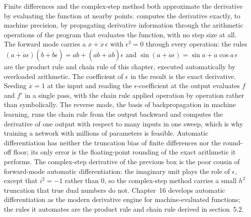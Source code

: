 \begin{mastery}
Finite differences and the complex-step method both approximate the
derivative by evaluating the function at nearby points.
 computes the derivative exactly,
to machine precision, by propagating derivative information through
the arithmetic operations of the program that evaluates the
function, with no step size at all. The forward mode carries a
 $x + \dot{x}\,\epsilon$ with $\epsilon^{2} =
0$ through every operation: the rules $\,(a + \dot{a}\epsilon)(b +
\dot{b}\epsilon) = ab + (a\dot{b} + \dot{a}b)\epsilon$ and
$\sin(a + \dot{a}\epsilon) = \sin a + \dot{a}\cos a\,\epsilon$ are
the product rule and chain rule of this chapter, executed
automatically by overloaded arithmetic. The coefficient of
$\epsilon$ in the result is the exact derivative. Seeding $\dot{x}
= 1$ at the input and reading the $\epsilon$-coefficient at the
output evaluates $f$ and $f'$ in a single pass, with the chain rule
applied operation by operation rather than symbolically. The
reverse mode, the basis of backpropagation in machine learning,
runs the chain rule from the output backward and computes the
derivative of one output with respect to many inputs in one sweep,
which is why training a network with millions of parameters is
feasible. Automatic differentiation has neither the truncation bias
of finite differences nor the round-off floor; its only error is
the floating-point rounding of the exact arithmetic it performs.
The complex-step derivative of the previous box is the poor cousin
of forward-mode automatic differentiation: the imaginary unit plays
the role of $\epsilon$, except that $i^{2} = -1$ rather than $0$, so
the complex-step method carries a small $h^{2}$ truncation that true
dual numbers do not. Chapter~16 develops automatic differentiation
as the modern derivative engine for machine-evaluated functions; the
rules it automates are the product rule and chain rule derived in
section~5.2.
\end{mastery}

